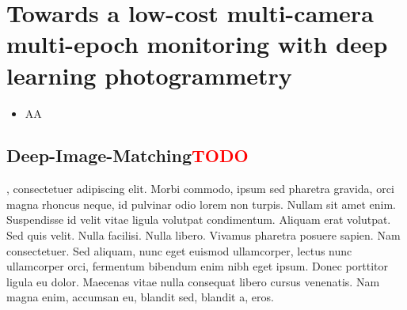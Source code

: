 \graphicspath{{figures/chapter5/}}
\onehalfspacing

\chapter{Towards a low-cost multi-camera multi-epoch monitoring with deep learning photogrammetry}\label{ch:5}

\vfill


\begin{itemize}
  \item AA
\end{itemize}

\newpage

\section{Deep-Image-Matching\textcolor{red}{TODO}}

, consectetuer adipiscing elit. Morbi commodo,
ipsum sed pharetra gravida, orci magna rhoncus neque, id pulvinar odio lorem non turpis.
Nullam sit amet enim. Suspendisse id velit vitae ligula volutpat condimentum. Aliquam
erat volutpat. Sed quis velit. Nulla facilisi. Nulla libero. Vivamus pharetra posuere
sapien. Nam consectetuer. Sed aliquam, nunc eget euismod ullamcorper, lectus nunc
ullamcorper orci, fermentum bibendum enim nibh eget ipsum. Donec porttitor ligula eu
dolor. Maecenas vitae nulla consequat libero cursus venenatis. Nam magna enim, accumsan
eu, blandit sed, blandit a, eros.


